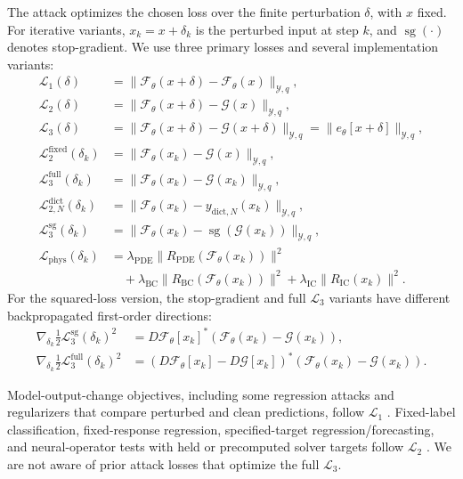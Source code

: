 ﻿\documentclass[letterpaper]{article} %
\begin{document}
The attack optimizes the chosen loss over the finite perturbation $\delta$,
with $x$ fixed. For iterative variants, $x_k=x+\delta_k$ is the perturbed input
at step $k$, and $\operatorname{sg}(\cdot)$ denotes stop-gradient. We use
three primary losses and several implementation variants:
\begin{equation*}
\begin{aligned}
\mathcal{L}_1(\delta)
&=\|\mathcal{F}_\theta(x+\delta)-\mathcal{F}_\theta(x)\|_{\mathcal{Y},q},\\
\mathcal{L}_2(\delta)
&=\|\mathcal{F}_\theta(x+\delta)-\mathcal{G}(x)\|_{\mathcal{Y},q},\\
\mathcal{L}_3(\delta)
&=\|\mathcal{F}_\theta(x+\delta)-\mathcal{G}(x+\delta)\|_{\mathcal{Y},q}=\|e_\theta[x+\delta]\|_{\mathcal{Y},q},\\
\mathcal{L}_2^{\mathrm{fixed}}(\delta_k)
&=\|\mathcal{F}_\theta(x_k)-\mathcal{G}(x)\|_{\mathcal{Y},q},\\
\mathcal{L}_3^{\mathrm{full}}(\delta_k)
&=\|\mathcal{F}_\theta(x_k)-\mathcal{G}(x_k)\|_{\mathcal{Y},q},\\
\mathcal{L}_{2,N}^{\mathrm{dict}}(\delta_k)
&=\|\mathcal{F}_\theta(x_k)-y_{\mathrm{dict},N}(x_k)\|_{\mathcal{Y},q},\\
\mathcal{L}_3^{\mathrm{sg}}(\delta_k)
&=\|\mathcal{F}_\theta(x_k)-\operatorname{sg}(\mathcal{G}(x_k))\|_{\mathcal{Y},q},\\
\mathcal{L}_{\mathrm{phys}}(\delta_k)
&=\lambda_{\mathrm{PDE}}\|R_{\mathrm{PDE}}(\mathcal{F}_\theta(x_k))\|^2\\
&\quad+\lambda_{\mathrm{BC}}\|R_{\mathrm{BC}}(\mathcal{F}_\theta(x_k))\|^2+\lambda_{\mathrm{IC}}\|R_{\mathrm{IC}}(x_k)\|^2.
\end{aligned}
\end{equation*}
For the squared-loss version, the stop-gradient and full $\mathcal{L}_3$
variants have different backpropagated first-order directions:
\begin{align*}
  \nabla_{\delta_k}\tfrac{1}{2}\mathcal{L}_3^{\mathrm{sg}}(\delta_k)^2
  &=
  D\mathcal{F}_\theta[x_k]^*
  (\mathcal{F}_\theta(x_k)-\mathcal{G}(x_k)),
  \nonumber\\
  \nabla_{\delta_k}\tfrac{1}{2}\mathcal{L}_3^{\mathrm{full}}(\delta_k)^2
  &=
  (D\mathcal{F}_\theta[x_k]-D\mathcal{G}[x_k])^*
  (\mathcal{F}_\theta(x_k)-\mathcal{G}(x_k)).
\end{align*}

Model-output-change objectives, including some regression attacks and
regularizers that compare perturbed and clean predictions, follow
$\mathcal{L}_1$
\citep{nguyen2018regression,mode2020mtsregression,liu2022forecastingattacks}.
Fixed-label classification, fixed-response regression, specified-target
regression/forecasting, and neural-operator tests with held or precomputed
solver targets follow $\mathcal{L}_2$
\citep{goodfellow2015explaining,madry2018towards,tong2018adversarialregression,ribeiro2023linearregression,liu2022forecastingattacks,adesoji2022evaluating}.
We are not aware of prior attack losses that optimize the full
$\mathcal{L}_3$.
\end{document}
